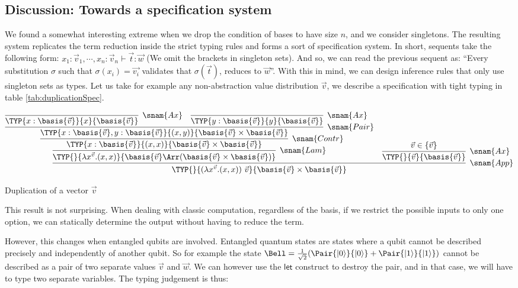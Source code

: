\subsection{Discussion: Towards a specification system}

We found a somewhat interesting extreme when we drop the condition of bases to have size $n$, and we consider singletons. The resulting system replicates the term reduction inside the strict typing rules and forms a sort of specification system. In short, sequents take the following form: $x_1: \vec{v}_1, \dotsb, x_n: \vec{v}_n \vdash \vec t : \vec{w}$ (We omit the brackets in singleton sets). And so, we can read the previous sequent as: ``Every substitution $\sigma$ such that $\sigma(x_i)=\vec{v_i}$ validates that $\sigma(\vec{t})$, reduces to $\vec{w}$''. With this in mind, we can design inference rules that only use singleton sets as types. Let us take for example any non-abstraction value distribution $\vec{v}$, we describe a specification with tight typing in table \ref{tab:duplicationSpec}.

\begin{table*}
\scriptsize
\[  
\infer[\snam{App}]
{\TYP{}{(\lambda x^{\vec{v}}. (x, x))\ \vec{v}}{\basis{\vec{v}}\times\basis{\vec{v}}}}
{\infer[\snam{Lam}]
  {\TYP{}{\lambda x^{\vec{v}}. (x, x)}{\basis{\vec{v}} \Arr (\basis{\vec{v}}\times\basis{\vec{v}})}}
  {
    \infer[\snam{Contr}]
    {\TYP{x:\basis{\vec{v}}}{(x, x)}{\basis{\vec{v}}\times\basis{\vec{v}}}}
    {
      \infer[\snam{Pair}]
      {\TYP{x:\basis{\vec{v}}, y:\basis{\vec{v}}}{(x, y)}{\basis{\vec{v}}\times\basis{\vec{v}}}}
      {
        \infer[\snam{Ax}]{\TYP{x:\basis{\vec{v}}}{x}{\basis{\vec{v}}}}{}&
        \infer[\snam{Ax}]{\TYP{y:\basis{\vec{v}}}{y}{\basis{\vec{v}}}}{}
      }
    }
  } &
  \infer[\snam{Ax}]
  {\TYP{}{\vec{v}}{\basis{\vec{v}}}}
  {\vec{v}\in\{\vec{v}\}}
}
\]
\caption{Duplication of a vector $\vec{v}$}
\label{tab:duplicationSpec}
\end{table*}

This result is not surprising. When dealing with classic computation, regardless of the basis, if we restrict the possible inputs to only one option, we can statically determine the output without having to reduce the term.

However, this changes when entangled qubits are involved. Entangled quantum states are states where a qubit cannot be described precisely and independently of another qubit. So for example the state $\Bell=\frac{1}{\sqrt{2}}(\Pair{\ket{0}}{\ket{0}} + \Pair{\ket{1}}{\ket{1}})$ cannot be described as a pair of two separate values $\vec{v}$ and $\vec{w}$. We can however use the $\mathsf{let}$ construct to destroy the pair, and in that case, we will have to type two separate variables. The typing judgement is thus:

